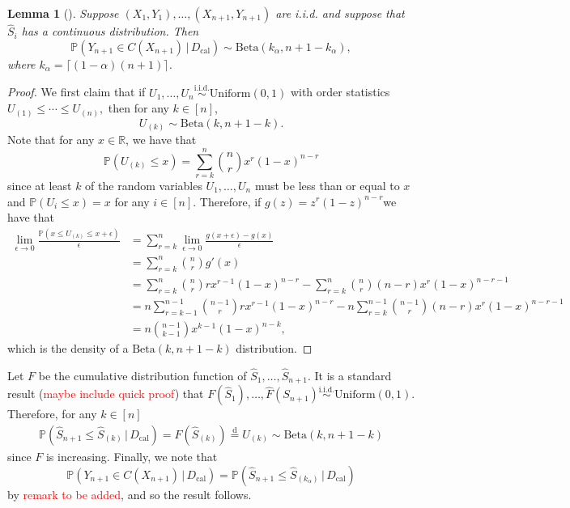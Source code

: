 \documentclass[11pt, titlepage]{article} %
\newcommand{\R}{\mathrm}
\newcommand{\Prob}[1]{\mathbb{P}\left( #1 \right)}
\numberwithin{equation}{section}
\newtheorem{lemma}{Lemma}
\theoremstyle{definition}
\numberwithin{theorem}{section}
\numberwithin{lemma}{section}
\numberwithin{corollary}{section}
\numberwithin{proposition}{section}
\numberwithin{definition}{section}
\numberwithin{remark}{section}
\begin{document}
\begin{lemma}[\cite{tibs_advanced_topics}]
    Suppose \((X_1, Y_1), \ldots, (X_{n+1}, Y_{n+1})\) are i.i.d. and suppose that \(\hat{S}_i\) has a continuous distribution. Then \begin{equation}
        \Prob{Y_{n+1} \in C(X_{n+1}) \, | \, D_\R{cal}} \sim \R{Beta}(k_\alpha, n + 1 - k_\alpha), 
    \label{eqn:beta_training_conditional}
    \end{equation} where \(k_\alpha = \lceil (1-\alpha)(n+1) \rceil\).
\end{lemma}
\begin{proof}
    We first claim that if \(U_1, \ldots, U_n \overset{\R{i.i.d.}}{\sim} \R{Uniform}(0,1)\) with order statistics \(U_{(1)} \leq \cdots \leq U_{(n)}, \) then for any \(k \in [n]\), \[U_{(k)} \sim \R{Beta}(k, n+1-k).\] Note that for any \(x \in \mathbb{R}\), we have that \[\Prob{U_{(k)} \leq x} = \sum_{r=k}^{n} \binom{n}{r} x^r (1-x)^{n-r}\] since at least \(k\) of the random variables \(U_1, \ldots, U_n\) must be less than or equal to \(x\) and \(\Prob{U_i \leq x} = x\) for any \(i \in [n]\). Therefore, if \(g(z) = z^r (1-z)^{n-r}\)we have that \begin{align*}
        \lim_{\epsilon \to 0} \frac{\Prob{x \leq U_{(k)} \leq x+\epsilon}}{\epsilon} &= \sum_{r=k}^{n} \lim_{\epsilon \to 0} \frac{g(x+\epsilon) - g(x)}{\epsilon} \\
        &= \sum_{r=k}^{n} \binom{n}{r} g'(x) \\
        &= \sum_{r=k}^{n} \binom{n}{r} r x^{r-1}(1-x)^{n-r} - \sum_{r=k}^{n} \binom{n}{r} (n-r) x^{r}(1-x)^{n-r-1} \\
        &= n \sum_{r=k-1}^{n-1} \binom{n-1}{r} r x^{r-1}(1-x)^{n-r} -  n \sum_{r=k}^{n-1} \binom{n-1}{r} (n-r) x^{r}(1-x)^{n-r-1} \\
        &= n \binom{n-1}{k-1} x^{k-1}(1-x)^{n-k},
    \end{align*}
    which is the density of a \(\R{Beta}(k, n+1-k)\) distribution. 
\end{proof}

\noindent
Let \(F\) be the cumulative distribution function of \(\hat{S}_1, \ldots, \hat{S}_{n+1}.\) It is a standard result (\textcolor{red}{maybe include quick proof}) that \(F(\hat{S}_1), \ldots, \hat{F}(S_{n+1}) \overset{\R{i.i.d.}}{\sim} \R{Uniform}(0,1).\) Therefore, for any \(k \in [n]\) \begin{align*}
    \Prob{\hat{S}_{n+1} \leq \hat{S}_{(k)} \, | \, D_\R{cal}} = F(\hat{S}_{(k)}) \overset{\R{d}}{=} U_{(k)} \sim \R{Beta}(k, n+1-k)
\end{align*} since \(F\) is increasing. Finally, we note that \[\Prob{Y_{n+1} \in C(X_{n+1}) \, | \, D_\R{cal}} = \Prob{\hat{S}_{n+1} \leq \hat{S}_{(k_\alpha)} \, | \, D_\R{cal}}\] by \textcolor{red}{remark to be added}, and so the result follows.
\end{document}
